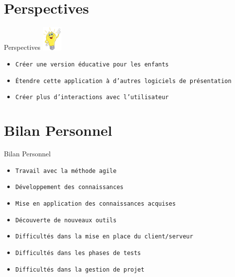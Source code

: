 \documentclass[10pt]{beamer}
\begin{document}
\section{Perspectives}
\begin{frame}{Perspectives}
		\includegraphics[width=1cm]{./images/idee}
	  	\begin{itemize}
			\item {\tt Créer une version éducative pour les enfants}
			\item {\tt Étendre cette application à d'autres logiciels de présentation}
			\item {\tt Créer plus d’interactions avec l'utilisateur }
		\end{itemize}
\end{frame}

\section{Bilan Personnel}
\begin{frame}{Bilan Personnel}
	\begin{itemize}
		\item {\tt Travail avec la méthode agile}
		\item {\tt Développement des connaissances}
		\item {\tt Mise en application des connaissances acquises}	
		\item {\tt Découverte de nouveaux outils}
		\item {\tt Difficultés dans la mise en place du client/serveur}
		\item {\tt Difficultés dans les phases de tests}
		\item {\tt Difficultés dans la gestion de projet}
	\end{itemize}
\end{frame}

\end{document}
